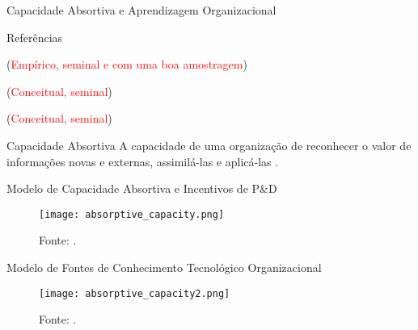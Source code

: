\begin{frame}
	\centering
	\fontsize{22pt}{24pt}\selectfont
	Capacidade Absortiva e Aprendizagem Organizacional
\end{frame}

\begin{frame}{Referências}
    \begin{vfilleditems}
    \footnotesize
    \item {} (\textcolor{red}{Empírico, seminal e com uma boa amostragem})
    \item {} (\textcolor{red}{Conceitual, seminal})
    \item {} (\textcolor{red}{Conceitual, seminal})
    \end{vfilleditems}
\end{frame}

\begin{frame}{Capacidade Absortiva}
	\Large A capacidade de uma organização de reconhecer o valor
	de informações novas e externas, assimilá-las e aplicá-las
	\parencite{cohen1990absorptive}.
\end{frame}

\begin{frame}{Modelo de Capacidade Absortiva e Incentivos de P\&D}
	\begin{figure}
		\centering
		\texttt{[image: absorptive\_capacity.png]}
		\caption{Fonte: \textcite{cohen1990absorptive}.}
		\label{fig:absorptive_capacity}
	\end{figure}
\end{frame}

\begin{frame}{Modelo de Fontes de Conhecimento Tecnológico Organizacional}
	\begin{figure}
		\centering
		\texttt{[image: absorptive\_capacity2.png]}
		\caption{Fonte: \textcite{cohen1990absorptive}.}
		\label{fig:absorptive_capacity2}
	\end{figure}
\end{frame}

